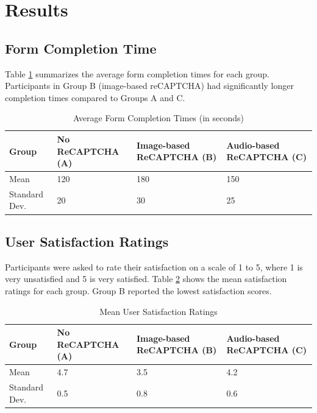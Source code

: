 \documentclass{article}
\begin{document}
\section{Results}
\subsection{Form Completion Time}
Table \ref{tab:completion_time} summarizes the average form completion times for each group. Participants in Group B (image-based reCAPTCHA) had significantly longer completion times compared to Groups A and C.

\begin{table}[ht]
\centering
\caption{Average Form Completion Times (in seconds)}
\label{tab:completion_time}
\begin{tabular}{@{}llll@{}}
\toprule
\textbf{Group} & \textbf{No ReCAPTCHA (A)} & \textbf{Image-based ReCAPTCHA (B)} & \textbf{Audio-based ReCAPTCHA (C)} \\ \midrule
Mean          & 120                       & 180                                  & 150                                 \\
Standard Dev. & 20                        & 30                                   & 25                                  \\ \bottomrule
\end{tabular}
\end{table}

\subsection{User Satisfaction Ratings}
Participants were asked to rate their satisfaction on a scale of 1 to 5, where 1 is very unsatisfied and 5 is very satisfied. Table \ref{tab:satisfaction_ratings} shows the mean satisfaction ratings for each group. Group B reported the lowest satisfaction scores.

\begin{table}[ht]
\centering
\caption{Mean User Satisfaction Ratings}
\label{tab:satisfaction_ratings}
\begin{tabular}{@{}llll@{}}
\toprule
\textbf{Group} & \textbf{No ReCAPTCHA (A)} & \textbf{Image-based ReCAPTCHA (B)} & \textbf{Audio-based ReCAPTCHA (C)} \\ \midrule
Mean          & 4.7                       & 3.5                                  & 4.2                                 \\
Standard Dev. & 0.5                       & 0.8                                   & 0.6                                  \\ \bottomrule
\end{tabular}
\end{table}
\end{document}

